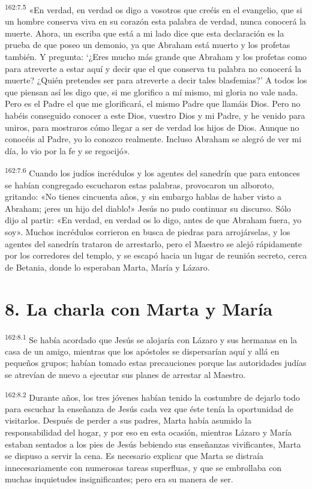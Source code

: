 \par 
\textsuperscript{162:7.5} «En verdad, en verdad os digo a vosotros que creéis en el evangelio, que si un hombre conserva viva en su corazón esta palabra de verdad, nunca conocerá la muerte. Ahora, un escriba que está a mi lado dice que esta declaración es la prueba de que poseo un demonio, ya que Abraham está muerto y los profetas también. Y pregunta: `¿Eres mucho más grande que Abraham y los profetas como para atreverte a estar aquí y decir que el que conserva tu palabra no conocerá la muerte? ¿Quién pretendes ser para atreverte a decir tales blasfemias?' A todos los que piensan así les digo que, si me glorifico a mí mismo, mi gloria no vale nada. Pero es el Padre el que me glorificará, el mismo Padre que llamáis Dios. Pero no habéis conseguido conocer a este Dios, vuestro Dios y mi Padre, y he venido para uniros, para mostraros cómo llegar a ser de verdad los hijos de Dios. Aunque no conocéis al Padre, yo lo conozco realmente. Incluso Abraham se alegró de ver mi día, lo vio por la fe y se regocijó».

\par 
\textsuperscript{162:7.6} Cuando los judíos incrédulos y los agentes del sanedrín que para entonces se habían congregado escucharon estas palabras, provocaron un alboroto, gritando: «No tienes cincuenta años, y sin embargo hablas de haber visto a Abraham; ¡eres un hijo del diablo!» Jesús no pudo continuar su discurso. Sólo dijo al partir: «En verdad, en verdad os lo digo, antes de que Abraham fuera, yo soy». Muchos incrédulos corrieron en busca de piedras para arrojárselas, y los agentes del sanedrín trataron de arrestarlo, pero el Maestro se alejó rápidamente por los corredores del templo, y se escapó hacia un lugar de reunión secreto, cerca de Betania, donde lo esperaban Marta, María y Lázaro.

\section*{8. La charla con Marta y María}
\par 
\textsuperscript{162:8.1} Se había acordado que Jesús se alojaría con Lázaro y sus hermanas en la casa de un amigo, mientras que los apóstoles se dispersarían aquí y allá en pequeños grupos; habían tomado estas precauciones porque las autoridades judías se atrevían de nuevo a ejecutar sus planes de arrestar al Maestro.

\par 
\textsuperscript{162:8.2} Durante años, los tres jóvenes habían tenido la costumbre de dejarlo todo para escuchar la enseñanza de Jesús cada vez que éste tenía la oportunidad de visitarlos. Después de perder a sus padres, Marta había asumido la responsabilidad del hogar, y por eso en esta ocasión, mientras Lázaro y María estaban sentados a los pies de Jesús bebiendo sus enseñanzas vivificantes, Marta se dispuso a servir la cena. Es necesario explicar que Marta se distraía innecesariamente con numerosas tareas superfluas, y que se embrollaba con muchas inquietudes insignificantes; pero era su manera de ser.


